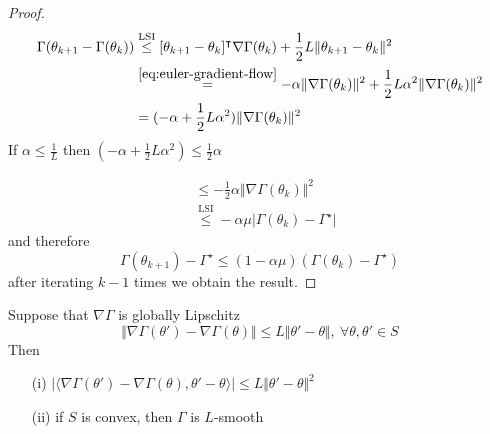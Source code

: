 \begin{proof}
    \begin{align*}
        \Gamma(\theta_{k+1}-\Gamma(\theta_k))& \stackrel{\text{LSI}}{\leq} [\theta_{k+1}-\theta_k]^\intercal\nabla\Gamma(\theta_k)+\frac{1}{2}L\Vert\theta_{k+1}-\theta_k \Vert^2\\
        &\stackrel{\ref{eq:euler-gradient-flow}}{=}-\alpha\Vert \nabla\Gamma(\theta_k)\Vert^2+\frac{1}{2}L\alpha^2\Vert \nabla\Gamma(\theta_k)\Vert^2\\
        &=(-\alpha+\frac{1}{2}L\alpha^2)\Vert \nabla\Gamma(\theta_k)\Vert^2
    \end{align*}
    If \(\alpha\leq \frac{1}{L}\) then \((-\alpha+\frac{1}{2}L\alpha^2)\leq \frac{1}{2}\alpha\)
    
    \begin{align*}
        &\leq -\frac{1}{2}\alpha \Vert \nabla\Gamma(\theta_k)\Vert^2\\
        &\stackrel{\text{LSI}}{\leq}-\alpha\mu\vert \Gamma(\theta_k)-\Gamma^\star\vert     
    \end{align*}
    and therefore 
    \[\Gamma(\theta_{k+1})-\Gamma^\star\leq (1-\alpha\mu)(\Gamma(\theta_k)-\Gamma^\star)\]
    after iterating \(k-1\) times  we obtain the result.
\end{proof}

\begin{lemma}\label{lem:33}
    Suppose that \(\nabla\Gamma\) is globally Lipschitz 
    \[\Vert \nabla\Gamma(\theta')-\nabla\Gamma(\theta)\Vert\leq L \Vert \theta'-\theta\Vert,\ \forall \theta,\theta'\in S\]
    Then \begin{enumerate}
        \item[(i)]  \(\vert\langle \nabla\Gamma(\theta')-\nabla\Gamma(\theta),\theta'-\theta\rangle\vert\leq L \Vert \theta'-\theta\Vert^2\)
        \item[(ii)] if \(S\) is convex, then \(\Gamma\) is \(L\)-smooth 
    \end{enumerate}
\end{lemma}

